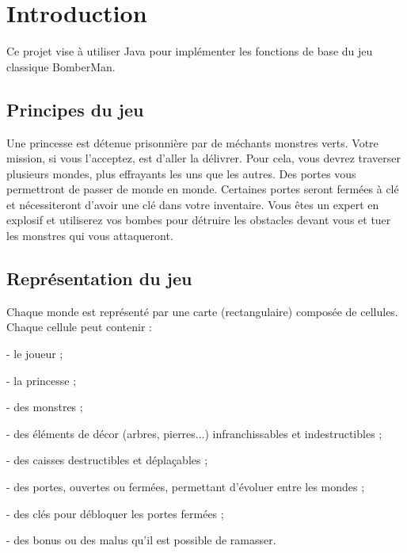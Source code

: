 \documentclass[11pt,english]{article}
\begin{document}
\pagebreak

\tableofcontents

\pagebreak

\large 

\section{Introduction}

\indent

Ce projet vise à utiliser Java pour implémenter les fonctions de base du jeu classique BomberMan.

\subsection{Principes du jeu}

\indent 

Une princesse est détenue prisonnière par de méchants monstres verts. Votre mission, si vous l'acceptez, est d'aller la délivrer. Pour cela, vous devrez traverser plusieurs mondes, plus effrayants les uns que les autres. Des portes vous permettront de passer de monde en monde. Certaines portes seront fermées à clé et nécessiteront d'avoir une clé dans votre inventaire. Vous êtes un expert en explosif et utiliserez vos bombes pour détruire les obstacles devant vous et tuer les monstres qui vous attaqueront.

\subsection{Représentation du jeu}

\indent

Chaque monde est représenté par une carte (rectangulaire) composée de cellules. Chaque cellule peut contenir :

-   le joueur ;

-   la princesse ;

-   des monstres ;

-   des éléments de décor (arbres, pierres...) infranchissables et
    indestructibles ;

-   des caisses destructibles et déplaçables ; 

-   des portes, ouvertes ou fermées, permettant d’évoluer entre les
    mondes ;

-   des clés pour débloquer les portes fermées ;

-   des bonus ou des malus qu'il est possible de ramasser.
\end{document}
